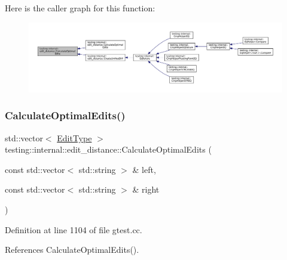 Here is the caller graph for this function\+:
\nopagebreak
\begin{figure}[H]
\begin{center}
\leavevmode
\includegraphics[width=350pt]{namespacetesting_1_1internal_1_1edit__distance_a26323b4c2a29ea8e187aafbd4d2275db_icgraph}
\end{center}
\end{figure}
\mbox{\label{namespacetesting_1_1internal_1_1edit__distance_a32267b2ae24de1de175ac8217406877d}} 
\subsubsection{\texorpdfstring{Calculate\+Optimal\+Edits()}{CalculateOptimalEdits()}\hspace{0.1cm}{\footnotesize\ttfamily [2/2]}}
{\footnotesize\ttfamily std\+::vector$<$ \hyperlink{namespacetesting_1_1internal_1_1edit__distance_ad46aa6da12aec1a3f166310478b53a08}{Edit\+Type} $>$ testing\+::internal\+::edit\+\_\+distance\+::\+Calculate\+Optimal\+Edits (\begin{DoxyParamCaption}\item[{const std\+::vector$<$ std\+::string $>$ \&}]{left,  }\item[{const std\+::vector$<$ std\+::string $>$ \&}]{right }\end{DoxyParamCaption})}



Definition at line 1104 of file gtest.\+cc.



References Calculate\+Optimal\+Edits().


